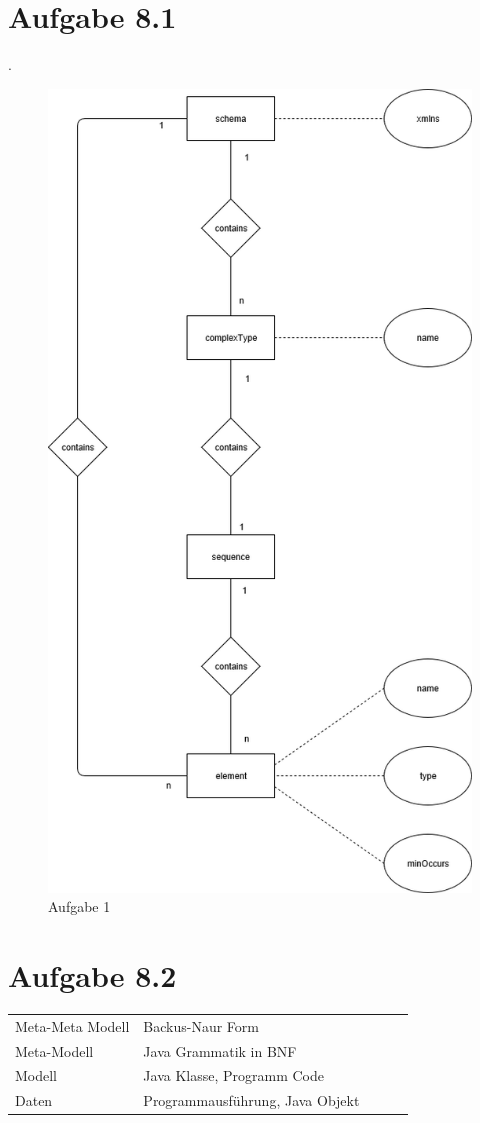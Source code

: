 \documentclass{article}
\begin{document}
	
	
	
	
	\section*{Aufgabe 8.1}.
		\begin{center}
	
			\begin{figure}
				\includegraphics[width=0.4\linewidth]{exercise_8_1.png}
				\caption{Aufgabe 1}
				\label{fig:exercise_8_1.png}
			\end{figure}
		\end{center}
		
		
	\newpage	
	\section*{Aufgabe 8.2}
	\begin{table}[]
		\begin{tabular}{|l|l|lll}
			\cline{1-2}
			Meta-Meta Modell & Backus-Naur Form                &  &  &  \\ \cline{1-2}
			Meta-Modell      & Java Grammatik in BNF           &  &  &  \\ \cline{1-2}
			Modell           & Java Klasse, Programm Code      &  &  &  \\ \cline{1-2}
			Daten            & Programmausführung, Java Objekt &  &  &  \\ \cline{1-2}
		\end{tabular}
	\end{table}
	
\end{document}
